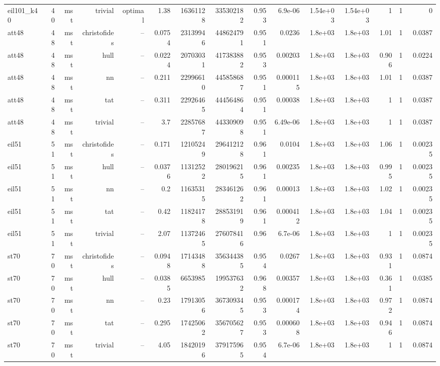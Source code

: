 \begin{tabular}{lrrrrrrrrrrrrrr}
eil101\_k40 & 40 & mst & trivial & optimal & 1.38 & 16361128 & 335302182 & 0.953 & 6.9e-06 & 1.54e+03 & 1.54e+03 & 1 & 1 & 0 \\
att48 & 48 & mst & christofides & -- & 0.0754 & 23139946 & 448624791 & 0.951 & 0.0236 & 1.8e+03 & 1.8e+03 & 1.01 & 1 & 0.0387 \\
att48 & 48 & mst & hull & -- & 0.0224 & 20703031 & 417383882 & 0.953 & 0.00203 & 1.8e+03 & 1.8e+03 & 0.906 & 1 & 0.0224 \\
att48 & 48 & mst & nn & -- & 0.211 & 22996610 & 445858687 & 0.951 & 0.000115 & 1.8e+03 & 1.8e+03 & 1.01 & 1 & 0.0387 \\
att48 & 48 & mst & tat & -- & 0.311 & 22926465 & 444564864 & 0.951 & 0.00038 & 1.8e+03 & 1.8e+03 & 1 & 1 & 0.0387 \\
att48 & 48 & mst & trivial & -- & 3.7 & 22857687 & 443309098 & 0.951 & 6.49e-06 & 1.8e+03 & 1.8e+03 & 1 & 1 & 0.0387 \\
eil51 & 51 & mst & christofides & -- & 0.171 & 12105249 & 296412128 & 0.961 & 0.0104 & 1.8e+03 & 1.8e+03 & 1.06 & 1 & 0.00235 \\
eil51 & 51 & mst & hull & -- & 0.0376 & 11312522 & 280196215 & 0.961 & 0.00235 & 1.8e+03 & 1.8e+03 & 0.995 & 1 & 0.00235 \\
eil51 & 51 & mst & nn & -- & 0.2 & 11635315 & 283461262 & 0.961 & 0.00013 & 1.8e+03 & 1.8e+03 & 1.02 & 1 & 0.00235 \\
eil51 & 51 & mst & tat & -- & 0.42 & 11824178 & 288531919 & 0.961 & 0.000412 & 1.8e+03 & 1.8e+03 & 1.04 & 1 & 0.00235 \\
eil51 & 51 & mst & trivial & -- & 2.07 & 11372465 & 276078416 & 0.96 & 6.7e-06 & 1.8e+03 & 1.8e+03 & 1 & 1 & 0.00235 \\
st70 & 70 & mst & christofides & -- & 0.0948 & 17143488 & 356344385 & 0.954 & 0.0267 & 1.8e+03 & 1.8e+03 & 0.931 & 1 & 0.0874 \\
st70 & 70 & mst & hull & -- & 0.0385 & 6653985 & 199537632 & 0.968 & 0.00357 & 1.8e+03 & 1.8e+03 & 0.361 & 1 & 0.0385 \\
st70 & 70 & mst & nn & -- & 0.23 & 17913056 & 367309345 & 0.953 & 0.000174 & 1.8e+03 & 1.8e+03 & 0.972 & 1 & 0.0874 \\
st70 & 70 & mst & tat & -- & 0.295 & 17425062 & 356705627 & 0.953 & 0.000608 & 1.8e+03 & 1.8e+03 & 0.946 & 1 & 0.0874 \\
st70 & 70 & mst & trivial & -- & 4.05 & 18420196 & 379175965 & 0.954 & 6.7e-06 & 1.8e+03 & 1.8e+03 & 1 & 1 & 0.0874 \\
\hline
\end{tabular}
